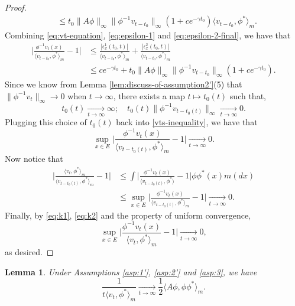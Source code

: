 \documentclass[UTF8]{pkuthss}
\theoremstyle{plain}
\newtheorem{lem}[thm]{Lemma}
\theoremstyle{definition}
\numberwithin{equation}{section}
\begin{document}
\begin{proof}
\begin{equation}
\begin{split}
	& \leq t_0\| A\phi\|_\infty \| \phi^{-1}v_{t-t_0}\|_\infty (1+ce^{-\gamma t_0}) \langle v_{t-t_0},\phi^* \rangle_m.
\end{split}\end{equation}
	Combining \eqref{eq:vt-equation}, \eqref{eq:epsilon-1} and \eqref{eq:epsilon-2-final}, we have that
\begin{equation}\label{vts-inequality}\begin{split}
	\Big|\frac{\phi^{-1}v_t(x)}{\langle v_{t-t_0},\phi^* \rangle_m}-1 \Big|
	&\leq \frac{|\epsilon_x^1(t_0,t)|}{\langle v_{t-t_0},\phi^* \rangle_m} + \frac{|\epsilon_x^2(t_0,t)|}{\langle v_{t-t_0},\phi^* \rangle_m}\\
	&\leq ce^{-\gamma t_0} +t_0\| A\phi\|_\infty \| \phi^{-1}v_{t-t_0}\|_\infty (1+ce^{-\gamma t_0}).
\end{split}\end{equation}
	Since we know from
	Lemma \ref{lem:discuss-of-assumption2'}(5)
	that $\| \phi^{-1}v_t\|_\infty\to 0$ when $t\to\infty$, there exists a map $t\mapsto t_0(t)$ such that,
\[
	t_0(t)
	\xrightarrow[t\to\infty]{} \infty;
	\quad t_0(t)\| \phi^{-1}v_{t-t_0(t)}\|_\infty
	\xrightarrow[t\to\infty]{} 0.
\]
	Plugging this choice of $t_0(t)$ back into \eqref{vts-inequality}, we have that
\begin{equation}\label{eq:k1}
	\sup_{x\in E}\Big|\frac{\phi^{-1}v_t(x)}{\langle v_{t-t_0(t)},\phi^* \rangle_m}-1 \Big|
	\xrightarrow[t\to\infty]{} 0.
\end{equation}
	Now notice that
\begin{equation}\label{eq:k2}\begin{split}
	\Big |\frac {\langle v_t, \phi^*\rangle_m} {\langle v_{t-t_0(t)} , \phi^*\rangle_m} - 1 \Big |
	&\leq \int \Big | \frac{\phi^{-1}v_t(x)}{\langle v_{t-t_0(t)} , \phi^*\rangle} - 1 \Big| \phi \phi^*(x) m(dx)\\
	&\leq \sup_{x\in E}\Big|\frac{\phi^{-1}v_t(x)}{\langle v_{t-t_0(t)},\phi^* \rangle_m}-1 \Big|
	\xrightarrow[t\to\infty]{} 0.
\end{split}\end{equation}
	Finally, by \eqref{eq:k1}, \eqref{eq:k2} and the property of uniform convergence,
\[
	\sup_{x\in E}\Big|\frac{\phi^{-1}v_t(x)}{\langle v_{t},\phi^* \rangle_m}-1 \Big|
	\xrightarrow[t\to\infty]{} 0,
\]
	as desired.
\end{proof}
\begin{lem}\label{lem:Kolmogorov-2}
	Under Assumptions \ref{asp:1'}, \ref{asp:2'} and \ref{asp:3}, we have
\[
	\frac{1}{t\langle v_t,\phi^*\rangle_m}
	\xrightarrow[t\to\infty]{} \frac{1}{2}\langle  A\phi,\phi\phi^*\rangle_m.
\]
\end{lem}
\end{document}
